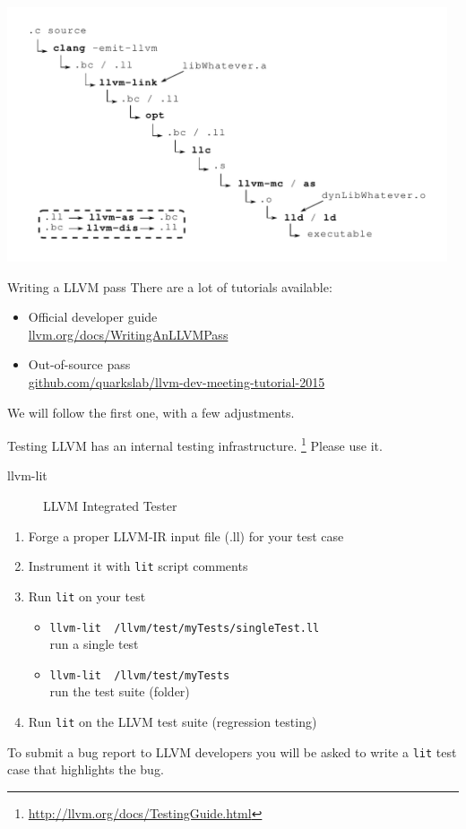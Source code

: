 \documentclass[10pt,mathserif]{beamer}
\begin{document}
\begin{frame}
	\noindent\hspace{-1.2cm}\includegraphics[width=13cm]{img/03/toolchain}
\end{frame}

\begin{frame}{Writing a LLVM pass}
	There are a lot of tutorials available:
	\vfill
	\begin{itemize}
		\item Official developer guide\\ \href{http://llvm.org/docs/WritingAnLLVMPass.html}{\url{llvm.org/docs/WritingAnLLVMPass}}
		\vfill
		\item Out-of-source pass\\ \href{https://github.com/quarkslab/llvm-dev-meeting-tutorial-2015}{\url{github.com/quarkslab/llvm-dev-meeting-tutorial-2015}}
	\end{itemize}
	\vfill
	We will follow the first one, with a few adjustments.
\end{frame}

\begin{frame}{Testing}
LLVM has an internal testing infrastructure. \footnote{\url{http://llvm.org/docs/TestingGuide.html}}
Please use it.
\\
\begin{description}
	\item[llvm-lit] LLVM Integrated Tester
\end{description}
\begin{enumerate}
	\item Forge a proper LLVM-IR input file (.ll) for your test case
	\item Instrument it with \texttt{lit} script comments
	\item Run \texttt{lit} on your test
		\begin{itemize}
			\item \texttt{llvm-lit ~/llvm/test/myTests/singleTest.ll}\\ run a single test
			\item \texttt{llvm-lit ~/llvm/test/myTests}\\ run the test suite (folder)
		\end{itemize}
	\item Run \texttt{lit} on the LLVM test suite (regression testing)
\end{enumerate}
\vfill
To submit a bug report to LLVM developers you will be asked to write a \texttt{lit} test case that highlights the bug.
\end{frame}
\end{document}
